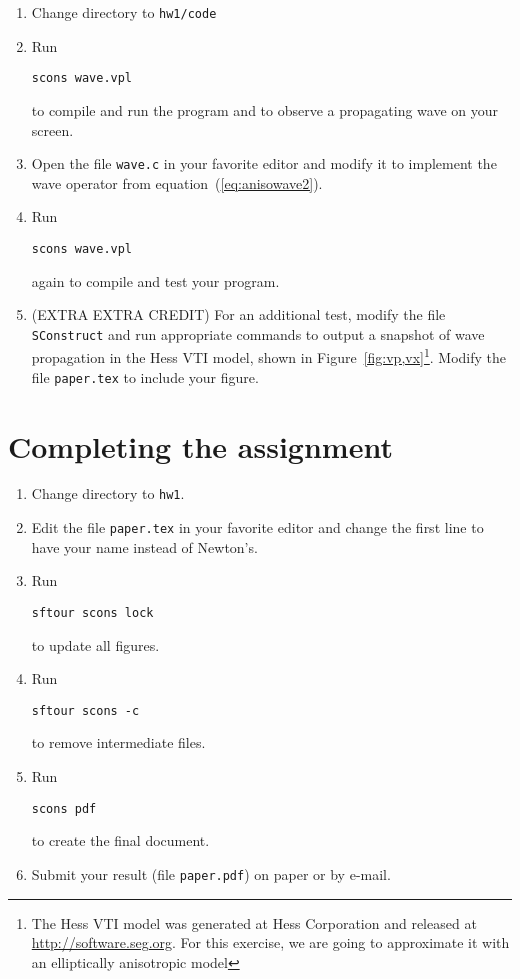 \begin{enumerate}
\item Change directory to \texttt{hw1/code}
\item Run
\begin{verbatim}
scons wave.vpl
\end{verbatim}
to compile and run the program and to observe a propagating wave on your screen.
\item Open the file \texttt{wave.c} in your favorite editor and modify it to implement the wave operator from equation~(\ref{eq:anisowave2}).
\item Run
\begin{verbatim}
scons wave.vpl
\end{verbatim}
again to compile and test your program. 
\item (EXTRA EXTRA CREDIT) For an additional test, modify the file \texttt{SConstruct} and run appropriate commands to output a snapshot of wave propagation in the Hess VTI model, shown in Figure~\ref{fig:vp,vx}\footnote{The Hess VTI model was generated at Hess Corporation and released at \url{http://software.seg.org}. For this exercise, we are going to approximate it with an elliptically anisotropic model}. Modify the file \texttt{paper.tex} to include your figure.
\end{enumerate}


\lstset{language=python,numbers=left,numberstyle=\tiny,showstringspaces=false}



\section{Completing the assignment}

\begin{enumerate}
\item Change directory to \texttt{hw1}.
\item Edit the file \texttt{paper.tex} in your favorite editor and change the
first line to have your name instead of Newton's.
\item Run
\begin{verbatim}
sftour scons lock
\end{verbatim}
to update all figures.
\item Run
\begin{verbatim}
sftour scons -c
\end{verbatim}
  to remove intermediate files.
\item Run
\begin{verbatim} 
scons pdf
\end{verbatim}
to create the final document.
\item Submit your result (file \texttt{paper.pdf}) on paper or by
e-mail.
\end{enumerate}



